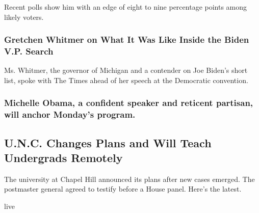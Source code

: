 \href{https://www.nytimes.com/2020/08/17/upshot/polls-2020-election-convention.html}{}

Recent polls show him with an edge of eight to nine percentage points
among likely voters.

\href{https://www.nytimes.com/2020/08/17/us/politics/gretchen-whitmer-interview.html}{}

\hypertarget{gretchen-whitmer-on-what-it-was-like-inside-the-biden-vp-search}{%
\subsubsection{Gretchen Whitmer on What It Was Like Inside the Biden
V.P.
Search}\label{gretchen-whitmer-on-what-it-was-like-inside-the-biden-vp-search}}

\href{https://www.nytimes.com/2020/08/17/us/politics/gretchen-whitmer-interview.html}{}

Ms. Whitmer, the governor of Michigan and a contender on Joe Biden's
short list, spoke with The Times ahead of her speech at the Democratic
convention.

\href{https://www.nytimes.com/live/2020/08/17/us/dnc-convention?action=click\&module=Spotlight\&pgtype=Homepage\#michelle-obama-a-confident-performer-and-reticent-partisan-will-anchor-mondays-program}{}

\hypertarget{michelle-obama-a-confident-speaker-and-reticent-partisan-will-anchor-mondays-program}{%
\subsubsection{Michelle Obama, a confident speaker and reticent
partisan, will anchor Monday's
program.}\label{michelle-obama-a-confident-speaker-and-reticent-partisan-will-anchor-mondays-program}}

\href{/2020/08/17/world/coronavirus-covid.html}{}

\hypertarget{unc-changes-plans-and-will-teach-undergrads-remotely}{%
\subsection{U.N.C. Changes Plans and Will Teach Undergrads
Remotely}\label{unc-changes-plans-and-will-teach-undergrads-remotely}}

The university at Chapel Hill announced its plans after new cases
emerged. The postmaster general agreed to testify before a House panel.
Here's the latest.

live

